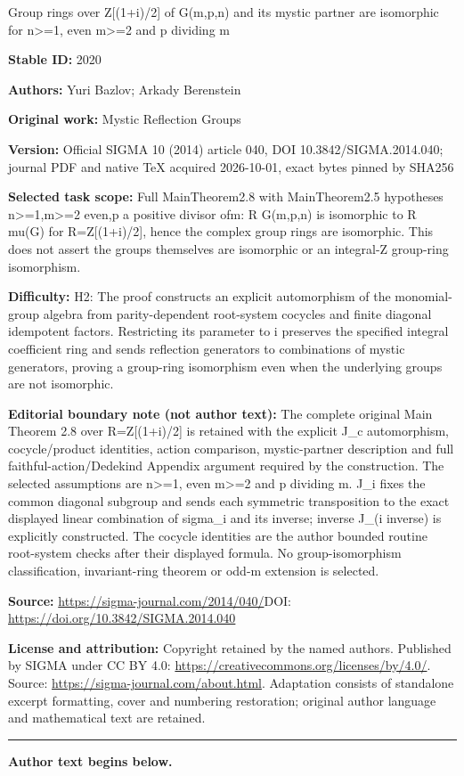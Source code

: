 \documentclass[11pt]{article}
\begin{document}
\begin{center}\Large Group rings over Z[(1+\allowbreak{}i)/2] of G(m,p,n) and its mystic partner are isomorphic for n>=\allowbreak{}1, even m>=\allowbreak{}2 and p dividing m\end{center}
\noindent\textbf{Stable ID:} 2020\par
\noindent\textbf{Authors:} Yuri Bazlov; Arkady Berenstein\par
\noindent\textbf{Original work:} Mystic Reflection Groups\par
\noindent\textbf{Version:} Official SIGMA 10 (2014) article 040, DOI 10.3842/SIGMA.2014.040; journal PDF and native TeX acquired 2026-10-01, exact bytes pinned by SHA256\par
\noindent\textbf{Selected task scope:} Full MainTheorem2.8 with MainTheorem2.5 hypotheses n>=\allowbreak{}1,m>=\allowbreak{}2 even,p a positive divisor ofm: R G(m,p,n) is isomorphic to R mu(G) for R=\allowbreak{}Z[(1+\allowbreak{}i)/2], hence the complex group rings are isomorphic. This does not assert the groups themselves are isomorphic or an integral-Z group-ring isomorphism.\par
\noindent\textbf{Difficulty:} H2: The proof constructs an explicit automorphism of the monomial-group algebra from parity-dependent root-system cocycles and finite diagonal idempotent factors. Restricting its parameter to i preserves the specified integral coefficient ring and sends reflection generators to combinations of mystic generators, proving a group-ring isomorphism even when the underlying groups are not isomorphic.\par
\noindent\textbf{Editorial boundary note (not author text):} The complete original Main Theorem 2.8 over R=\allowbreak{}Z[(1+\allowbreak{}i)/2] is retained with the explicit J\_c automorphism, cocycle/product identities, action comparison, mystic-partner description and full faithful-action/Dedekind Appendix argument required by the construction. The selected assumptions are n>=\allowbreak{}1, even m>=\allowbreak{}2 and p dividing m. J\_i fixes the common diagonal subgroup and sends each symmetric transposition to the exact displayed linear combination of sigma\_i and its inverse; inverse J\_(i inverse) is explicitly constructed. The cocycle identities are the author bounded routine root-system checks after their displayed formula. No group-isomorphism classification, invariant-ring theorem or odd-m extension is selected.\par
\noindent\textbf{Source:} \url{https://sigma-journal.com/2014/040/}\quad DOI: \url{https://doi.org/10.3842/SIGMA.2014.040}\par
\noindent\textbf{License and attribution:} Copyright retained by the named authors. Published by SIGMA under CC BY 4.0: \url{https://creativecommons.org/licenses/by/4.0/}. Source: \url{https://sigma-journal.com/about.html}. Adaptation consists of standalone excerpt formatting, cover and numbering restoration; original author language and mathematical text are retained.\par
\medskip\hrule\medskip\noindent\textbf{Author text begins below.}\par
\setcounter{section}{1}
\setcounter{subsection}{0}
\setcounter{subsubsection}{0}
\setcounter{Theorem}{3}
\setcounter{equation}{0}
\end{document}
